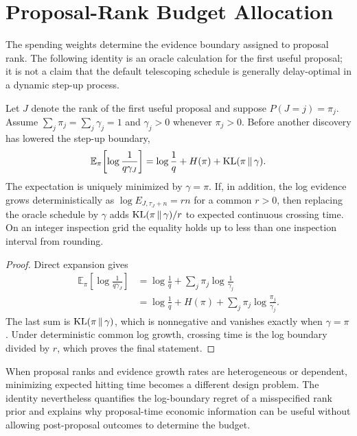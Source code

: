 \section{Proposal-Rank Budget Allocation}
\label{app:rank-budget}

The spending weights determine the evidence boundary assigned to proposal
rank.  The following identity is an oracle calculation for the first useful
proposal; it is not a claim that the default telescoping schedule is generally
delay-optimal in a dynamic step-up process.

\begin{proposition}
\label{prop:app-oracle-budget}
Let \(J\) denote the rank of the first useful proposal and suppose
\(P(J=j)=\pi_j\).  Assume \(\sum_j\pi_j=\sum_j\gamma_j=1\) and
\(\gamma_j>0\) whenever \(\pi_j>0\).  Before another discovery has lowered
the step-up boundary,
\begin{equation}
 \mathbb E_\pi\!\left[\log\frac{1}{q\gamma_J}\right]
 =\log\frac1q+H(\pi)+\operatorname{KL}(\pi\,\|\,\gamma).
 \label{eq:app-rank-identity}
\end{equation}
The expectation is uniquely minimized by \(\gamma=\pi\).  If, in addition,
the log evidence grows deterministically as
\(\log E_{J,\tau_J+n}=rn\) for a common \(r>0\), then replacing the oracle
schedule by \(\gamma\) adds \(\operatorname{KL}(\pi\,\|\,\gamma)/r\) to expected
continuous crossing time.  On an integer inspection grid the equality holds
up to less than one inspection interval from rounding.
\end{proposition}

\begin{proof}
Direct expansion gives
\begin{align*}
 \mathbb E_\pi\!\left[\log\frac{1}{q\gamma_J}\right]
 &=\log\frac1q+\sum_j\pi_j\log\frac1{\gamma_j}\\
 &=\log\frac1q+H(\pi)
   +\sum_j\pi_j\log\frac{\pi_j}{\gamma_j}.
\end{align*}
The last sum is \(\operatorname{KL}(\pi\,\|\,\gamma)\), which is nonnegative and vanishes
exactly when \(\gamma=\pi\).  Under deterministic common log growth, crossing
time is the log boundary divided by \(r\), which proves the final statement.
\end{proof}

When proposal ranks and evidence growth rates are heterogeneous or dependent,
minimizing expected hitting time becomes a different design problem.  The
identity nevertheless quantifies the log-boundary regret of a misspecified
rank prior and explains why proposal-time economic information can be useful
without allowing post-proposal outcomes to determine the budget.

